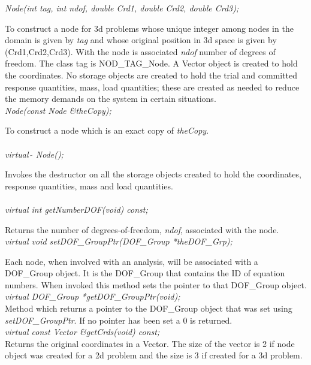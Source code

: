 {\em Node(int tag, int ndof, double Crd1, double Crd2, double Crd3);}

To construct a node for 3d problems whose unique integer among nodes in the
domain is given by {\em tag} and whose original position in 3d space
is given by (Crd1,Crd2,Crd3). With the node is associated {\em ndof} number
of degrees of freedom. The class tag is NOD\_TAG\_Node. A Vector object
is created to hold the coordinates. No
storage objects are created to hold the trial and committed response
quantities, mass, load quantities; these are created as needed to
reduce the memory demands on the system in certain situations. \\ 



{\em Node(const Node \&theCopy);}

To construct a node which is an exact copy of {\em theCopy}. \\

  \\
{\em virtual~$\tilde{}$ Node();} 

Invokes the destructor on all the storage objects created to hold the coordinates,
response quantities, mass and load quantities. \\

  \\
{\em virtual int  getNumberDOF(void) const;}

Returns the number of degrees-of-freedom, {\em ndof}, associated with
the node. \\

{\em virtual void setDOF\_GroupPtr(DOF\_Group *theDOF\_Grp);} 

Each node, when involved with an analysis, will be associated with a
DOF\_Group object. It is the DOF\_Group that contains the ID of equation
numbers. When invoked this method sets the pointer to that DOF\_Group object. \\

{\em virtual DOF\_Group *getDOF\_GroupPtr(void);} \\
Method which returns a pointer to the DOF\_Group object that was set
using {\em setDOF\_GroupPtr}. If no pointer has been set a $0$ is
returned. \\

{\em virtual const Vector \&getCrds(void) const;}  \\
Returns the original coordinates in a Vector. The size of the vector
is 2 if node object was created for a 2d problem and the size is 3 if
created for a 3d problem. \\

